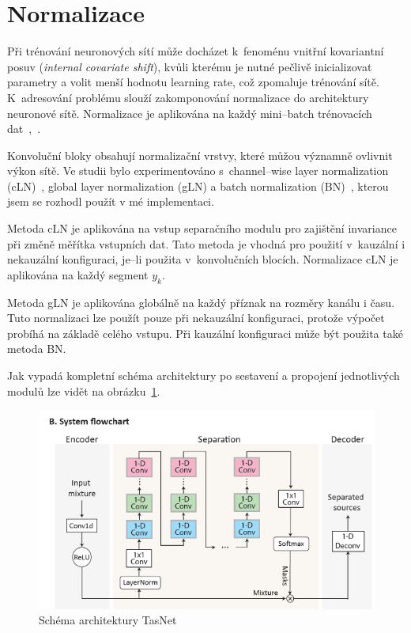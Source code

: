 

\section{Normalizace}
Při trénování neuronových sítí může docházet k~fenoménu  vnitřní kovariantní posuv (\textit{internal covariate shift}), kvůli kterému je nutné pečlivě inicializovat parametry a volit menší hodnotu learning rate, což zpomaluje trénování sítě. K~adresování problému slouží zakomponování normalizace do architektury neuronové sítě. Normalizace je aplikována na každý mini--batch trénovacích dat~\cite{ioffe2015batch},~\cite{ba2016layer}.

Konvoluční bloky obsahují normalizační vrstvy, které můžou významně ovlivnit výkon sítě. Ve studii bylo experimentováno s~channel--wise layer normalization (cLN)~, global layer normalization (gLN) a batch normalization (BN)~\cite{ioffe2015batch}, kterou jsem se rozhodl použít v mé implementaci.

Metoda cLN je aplikována na vstup separačního modulu pro zajištění invariance při změně měřítka vstupních dat. Tato metoda je vhodná pro použití v~kauzální i nekauzální konfiguraci, je--li použita v~konvolučních blocích. Normalizace cLN je aplikována na každý segment $y_k$. 

Metoda gLN je aplikována globálně na každý příznak na rozměry kanálu i času. Tuto normalizaci lze použít pouze při nekauzální konfiguraci, protože výpočet probíhá na základě celého vstupu.
Při kauzální konfiguraci může být použita také metoda BN.

\bigskip

Jak vypadá kompletní schéma architektury po sestavení a propojení jednotlivých modulů lze vidět na obrázku~\ref{fig:tasnet-modul}. 

\begin{figure}[H]
    \centering
    \includegraphics[scale=0.7]{obrazky-figures/tasnet-architecture.png}
    \caption{\label{fig:tasnet-modul}Schéma architektury TasNet}
\end{figure}


